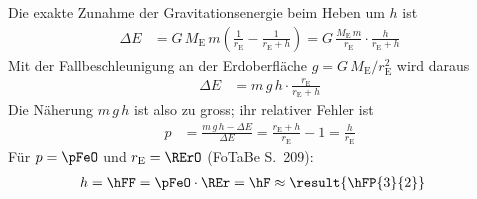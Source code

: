 Die exakte Zunahme der Gravitationsenergie beim Heben um $h$ ist
\begin{align}
 \Delta E &= G\,M_\mathrm{E}\,m\left(\frac{1}{r_\mathrm{E}}-\frac{1}{r_\mathrm{E}+h}\right)
   = G\,\frac{M_\mathrm{E}\,m}{r_\mathrm{E}}\cdot\frac{h}{r_\mathrm{E}+h}
\end{align}
Mit der Fallbeschleunigung an der Erdoberfläche $g = G\,M_\mathrm{E}/r_\mathrm{E}^2$ wird daraus
\begin{align}
 \Delta E &= m\,g\,h\cdot\frac{r_\mathrm{E}}{r_\mathrm{E}+h}
\end{align}
Die Näherung $m\,g\,h$ ist also zu gross; ihr relativer Fehler ist
\begin{align}
 p &= \frac{m\,g\,h-\Delta E}{\Delta E} = \frac{r_\mathrm{E}+h}{r_\mathrm{E}}-1 = \frac{h}{r_\mathrm{E}}
\end{align}
Für $p = \pFeO$ und $r_\mathrm{E} = \RErO$ (FoTaBe S.~209):
\begin{align}
 h &= \hFF = \pFeO\cdot\REr = \hF \approx \result{\hFP{3}{2}}
\end{align}
